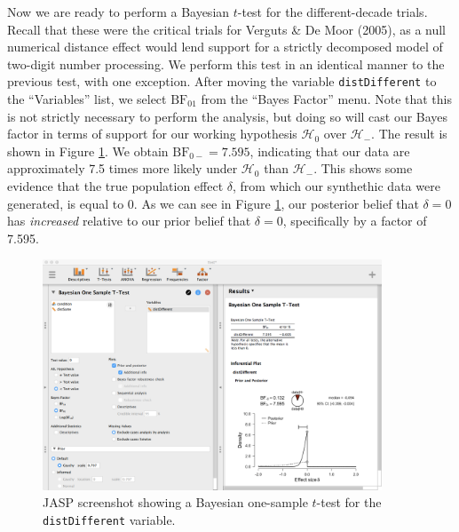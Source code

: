 \documentclass[english,,doc,floatsintext]{apa6}
\begin{document}
Now we are ready to perform a Bayesian \(t\)-test for the different-decade trials. Recall that these were the critical trials for Verguts \& De Moor (2005), as a null numerical distance effect would lend support for a strictly decomposed model of two-digit number processing. We perform this test in an identical manner to the previous test, with one exception. After moving the variable \texttt{distDifferent} to the \enquote{Variables} list, we select \(\text{BF}_{01}\) from the \enquote{Bayes Factor} menu. Note that this is not strictly necessary to perform the analysis, but doing so will cast our Bayes factor in terms of support for our working hypothesis \(\mathcal{H}_{0}\) over \(\mathcal{H}_{-}\). The result is shown in Figure \ref{fig:ttestBayes2}. We obtain \(\text{BF}_{0-}=7.595\), indicating that our data are approximately 7.5 times more likely under \(\mathcal{H}_{0}\) than \(\mathcal{H}_{-}\). This shows some evidence that the true population effect \(\delta\), from which our synthethic data were generated, is equal to 0. As we can see in Figure \ref{fig:ttestBayes2}, our posterior belief that \(\delta=0\) has \emph{increased} relative to our prior belief that \(\delta=0\), specifically by a factor of 7.595.

\begin{figure}
\centering
\includegraphics[width=0.9\textwidth,height=\textheight]{figures/ttestBayes2.png}
\caption{\label{fig:ttestBayes2}JASP screenshot showing a Bayesian one-sample \(t\)-test for the \texttt{distDifferent} variable.}
\end{figure}
\end{document}
